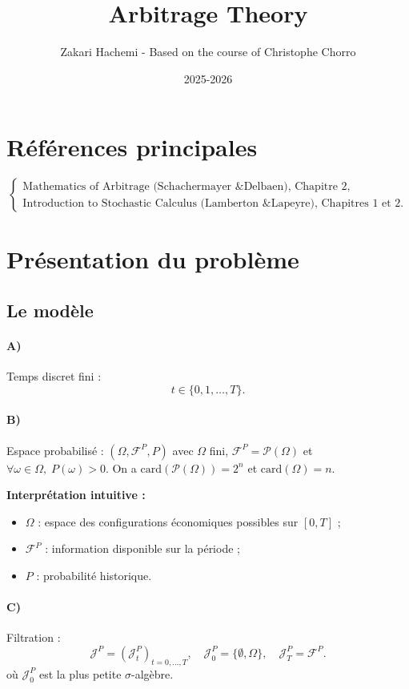 \documentclass[12pt,a4paper]{article}
\title{\textbf{Arbitrage Theory}}
\author{Zakari Hachemi - Based on the course of Christophe Chorro}
\date{2025-2026}
\numberwithin{equation}{section}
\theoremstyle{plain} %
\theoremstyle{definition} %
\theoremstyle{remark} %
\theoremstyle{myexample}
\theoremstyle{definition}
\begin{document}
\maketitle
\setcounter{tocdepth}{2}
\tableofcontents
\bigskip

\section*{Références principales}
\[
\begin{cases}
\text{Mathematics of Arbitrage (Schachermayer \& Delbaen), Chapitre 2},\\[3pt]
\text{Introduction to Stochastic Calculus (Lamberton \& Lapeyre), Chapitres 1 et 2.}
\end{cases}
\]

\section{Présentation du problème}

\subsection{Le modèle}

\paragraph{A)} Temps discret fini :
\[
t \in \{0, 1, \ldots, T\}.
\]

\paragraph{B)} Espace probabilisé : \((\Omega, \mathcal{F}^{P}, P)\)
avec $\Omega$ fini, $\mathcal{F}^{P} = \mathcal{P}(\Omega)$ et $\forall \omega \in \Omega,\; P(\omega)>0$. On a $\text{card}(\mathcal{P}(\Omega)) = 2^n$ et $\text{card}(\Omega) = n$.

\medskip
\textbf{Interprétation intuitive :}
\begin{itemize}
    \item $\Omega$ : espace des configurations économiques possibles sur $[0,T]$ ;
    \item $\mathcal{F}^{P}$ : information disponible sur la période ;
    \item $P$ : probabilité historique.
\end{itemize}

\paragraph{C)} Filtration :
\[
\mathcal{J}^{P} = (\mathcal{J}^{P}_{t})_{t=0,\ldots,T}, \quad \mathcal{J}^{P}_{0}=\{\emptyset,\Omega\}, \quad \mathcal{J}^{P}_{T}=\mathcal{F}^{P}.
\]
où $\mathcal{J}^{P}_{0}$ est la plus petite $\sigma$-algèbre.
\end{document}
